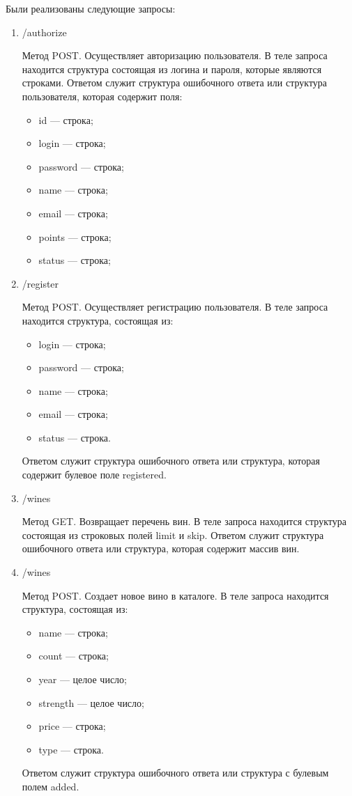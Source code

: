 Были реализованы следующие запросы:
\begin{enumerate}[label=\arabic*)]
	\item /authorize

 Метод POST. Осуществляет авторизацию пользователя. В теле запроса находится структура состоящая из логина и пароля, которые являются строками. Ответом служит структура ошибочного ответа или структура пользователя, которая содержит поля:
 \begin{itemize}[label*=---]
	\item id --- строка;
	\item login --- строка;
	\item password --- строка;
        \item name --- строка;
        \item email --- строка;
        \item points --- строка;
        \item status --- строка;
\end{itemize}
 
	\item /register

Метод POST. Осуществляет регистрацию пользователя. В теле запроса находится структура, состоящая из:
\begin{itemize}[label*=---]
	\item login --- строка;
	\item password --- строка;
        \item name --- строка;
        \item email --- строка;
        \item status --- строка.
\end{itemize}
Ответом служит структура ошибочного ответа или структура, которая содержит булевое поле registered.
 
	\item /wines

Метод GET. Возвращает перечень вин. В теле запроса находится структура состоящая из строковых полей limit и skip.
Ответом служит структура ошибочного ответа или структура, которая содержит массив вин.

        \item /wines

Метод POST. Создает новое вино в каталоге. В теле запроса находится структура, состоящая из:
\begin{itemize}[label*=---]
	\item name --- строка;
	\item count --- строка;
        \item year --- целое число;
        \item strength --- целое число;
        \item price --- строка;
        \item type --- строка.
\end{itemize}
Ответом служит структура ошибочного ответа или структура с булевым полем added.


\end{enumerate}
